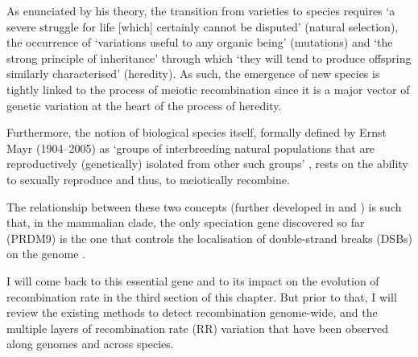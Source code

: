 As enunciated by his theory, the transition from varieties to species requires ‘a severe struggle for life [which] certainly cannot be disputed’ (natural selection), the occurrence of ‘variations useful to any organic being’ (mutations) and ‘the strong principle of inheritance’ through which ‘they will tend to produce offspring similarly characterised’ (heredity).
As such, the emergence of new species is tightly linked to the process of meiotic recombination since it is a major vector of genetic variation at the heart of the process of heredity.


Furthermore, the notion of biological species itself, formally defined by Ernst Mayr (1904--2005) as ‘groups of interbreeding natural populations that are reproductively (genetically) isolated from other such groups’ \citep{mayr1999systematics}, rests on the ability to sexually reproduce and thus, to meiotically recombine.

The relationship between these two concepts (further developed in \citealp{felsenstein1981skepticism} and \citealp{butlin2005recombination}) is such that, in the mammalian clade, the only speciation gene discovered so far (PRDM9) is the one that controls the localisation of double-strand breaks (DSBs) on the genome \citep{baudat2010prdm9,myers2010drive,parvanov2010prdm9}.

I will come back to this essential gene and to its impact on the evolution of recombination rate in the third section of this chapter. 
But prior to that, I will review the existing methods to detect recombination genome-wide, and the multiple layers of recombination rate (RR) variation that have been observed along genomes and across species.



